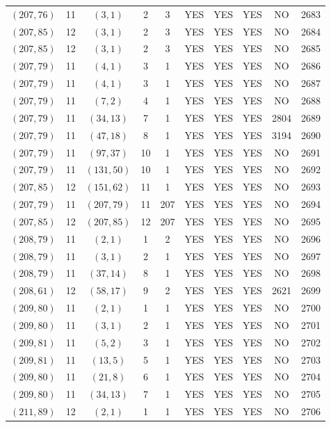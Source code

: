\begin{longtable}{|c|c|c|c|c|c|c|c|c|c|}
$(207, 76)$ & 11 & $(3, 1)$ & 2 & 3 & YES & YES & YES & NO & 2683\\
$(207, 85)$ & 12 & $(3, 1)$ & 2 & 3 & YES & YES & YES & NO & 2684\\
$(207, 85)$ & 12 & $(3, 1)$ & 2 & 3 & YES & YES & YES & NO & 2685\\
$(207, 79)$ & 11 & $(4, 1)$ & 3 & 1 & YES & YES & YES & NO & 2686\\
$(207, 79)$ & 11 & $(4, 1)$ & 3 & 1 & YES & YES & YES & NO & 2687\\
$(207, 79)$ & 11 & $(7, 2)$ & 4 & 1 & YES & YES & YES & NO & 2688\\
$(207, 79)$ & 11 & $(34, 13)$ & 7 & 1 & YES & YES & YES & 2804 & 2689\\
$(207, 79)$ & 11 & $(47, 18)$ & 8 & 1 & YES & YES & YES & 3194 & 2690\\
$(207, 79)$ & 11 & $(97, 37)$ & 10 & 1 & YES & YES & YES & NO & 2691\\
$(207, 79)$ & 11 & $(131, 50)$ & 10 & 1 & YES & YES & YES & NO & 2692\\
$(207, 85)$ & 12 & $(151, 62)$ & 11 & 1 & YES & YES & YES & NO & 2693\\
$(207, 79)$ & 11 & $(207, 79)$ & 11 & 207 & YES & YES & YES & NO & 2694\\
$(207, 85)$ & 12 & $(207, 85)$ & 12 & 207 & YES & YES & YES & NO & 2695\\
$(208, 79)$ & 11 & $(2, 1)$ & 1 & 2 & YES & YES & YES & NO & 2696\\
$(208, 79)$ & 11 & $(3, 1)$ & 2 & 1 & YES & YES & YES & NO & 2697\\
$(208, 79)$ & 11 & $(37, 14)$ & 8 & 1 & YES & YES & YES & NO & 2698\\
$(208, 61)$ & 12 & $(58, 17)$ & 9 & 2 & YES & YES & YES & 2621 & 2699\\
$(209, 80)$ & 11 & $(2, 1)$ & 1 & 1 & YES & YES & YES & NO & 2700\\
$(209, 80)$ & 11 & $(3, 1)$ & 2 & 1 & YES & YES & YES & NO & 2701\\
$(209, 81)$ & 11 & $(5, 2)$ & 3 & 1 & YES & YES & YES & NO & 2702\\
$(209, 81)$ & 11 & $(13, 5)$ & 5 & 1 & YES & YES & YES & NO & 2703\\
$(209, 80)$ & 11 & $(21, 8)$ & 6 & 1 & YES & YES & YES & NO & 2704\\
$(209, 80)$ & 11 & $(34, 13)$ & 7 & 1 & YES & YES & YES & NO & 2705\\
$(211, 89)$ & 12 & $(2, 1)$ & 1 & 1 & YES & YES & YES & NO & 2706\\

\end{longtable}
